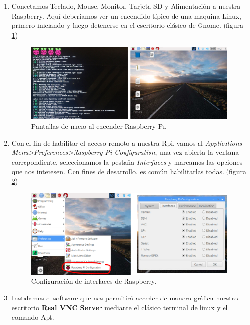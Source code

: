 \documentclass[letterpaper, 10pt]{report}
\begin{document}
\begin{enumerate}
	\item Conectamos Teclado, Mouse, Monitor, Tarjeta SD y Alimentación a nuestra Raspberry.  Aquí deberíamos ver un encendido típico de una maquina Linux, primero iniciando y luego detenerse en el escritorio clásico de Gnome. (figura \ref{startup})

\begin{figure}[h]
	\centering
	\includegraphics[scale=0.3]{startup.png}
	\caption{Pantallas de inicio al encender Raspberry Pi. \label{startup}}
\end{figure}	

\item Con el fin de habilitar el acceso remoto a nuestra Rpi, vamos al \emph{Applications Menu>Preferences>Raspberry Pi Configuration}, una vez abierta la ventana correpondiente, seleccionamos la pestaña \emph{Interfaces} y marcamos las opciones que nos interesen. Con fines de desarrollo, es común habilitarlas todas. (figura \ref{piConf})

\begin{figure}[h]
	\centering
	\includegraphics[scale=0.3]{piConf.png}
	\caption{Configuración de interfaces de Raspberry. \label{piConf}}
\end{figure}

\item Instalamos el software que nos permitirá acceder de manera gráfica nuestro escritorio \textbf{Real VNC Server} mediante el clásico terminal de linux y el comando Apt.


\end{enumerate}
\end{document}
